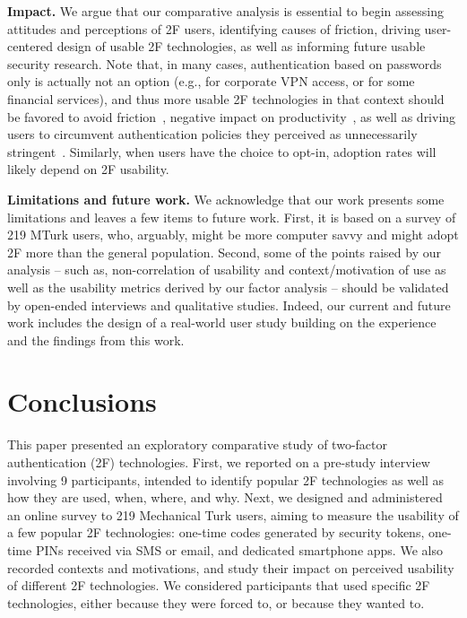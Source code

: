 \documentclass[conference]{IEEEtran}
\newcommand{\descr}[1]{\vspace{0.25cm} \noindent \textbf{#1}}
\begin{document}
\descr{Impact.} We argue that our comparative analysis is essential to begin assessing attitudes and perceptions of 2F users, identifying causes of friction, driving user-centered design of usable 2F technologies, as well as informing future usable security research.
Note that, in many cases, authentication based on passwords only is actually not an option (e.g., for corporate VPN access, or for some financial services), and thus more usable 2F technologies in that context should be favored 
to avoid friction~\cite{adams1999users}, negative impact on productivity~\cite{strouble2009productivity,inglesant2010true}, as well as driving users to circumvent authentication policies they perceived as unnecessarily stringent~\cite{inglesant2010true}.
Similarly, when users have the choice to opt-in, adoption rates will likely depend on 2F usability. 



\descr{Limitations and future work.} We acknowledge that our work presents some limitations and leaves a few items to future work. First, it is based on a survey of 219 MTurk users, who, arguably, might be more computer savvy and might adopt 2F more than the general population. Second, some of the points raised by our analysis -- such as, non-correlation of usability and context/motivation of use as well as the usability metrics derived by our factor analysis -- should be validated by open-ended interviews and qualitative studies. Indeed, our current and future work includes the design of a real-world user study building on the experience and the findings from this work.


\section{Conclusions}
This paper presented an exploratory comparative study of two-factor authentication (2F) technologies. First, we reported on a pre-study interview involving 9 participants, intended to identify popular 2F technologies as well as how they are used, when, where, and why. Next, we designed and administered an online survey to 219 Mechanical Turk users, aiming to measure the usability of a few popular 2F technologies: one-time codes generated by security tokens, one-time PINs received via SMS or email, and dedicated smartphone apps. We also recorded contexts and motivations, and study their impact on perceived usability of different 2F technologies. We considered participants that used specific 2F technologies, either because they were forced to, or because they wanted to.
\end{document}
